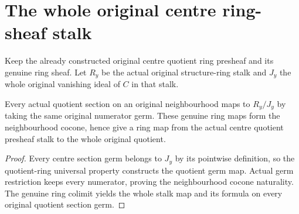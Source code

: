 \section{The whole original centre ring-sheaf stalk}

Keep the already constructed original centre quotient ring presheaf and
its genuine ring sheaf. Let $R_y$ be the actual original structure-ring
stalk and $J_y$ the whole original vanishing ideal of $C$ in that stalk.

\begin{definition}
\label{hir:real-domain-actual-centre-ring-original-quotient-germs}
\leanok
Every actual quotient section on an original neighbourhood maps to
$R_y/J_y$ by taking the same original numerator germ. These genuine ring
maps form the neighbourhood cocone, hence give a ring map from the
actual centre quotient presheaf stalk to the whole original quotient.
\end{definition}
\begin{proof}
Every centre section germ belongs to $J_y$ by its pointwise definition,
so the quotient-ring universal property constructs the quotient germ
map. Actual germ restriction keeps every numerator, proving the
neighbourhood cocone naturality. The genuine ring colimit yields the
whole stalk map and its formula on every original quotient section germ.
\end{proof}

